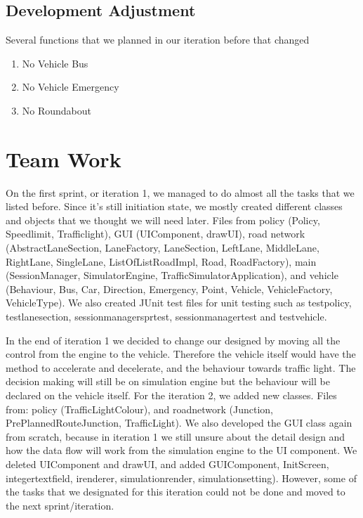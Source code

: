 \documentclass[11pt]{article}
\begin{document}
\subsection{Development Adjustment}
Several functions that we planned in our iteration before that changed
\begin{enumerate}[noitemsep]
	\item No Vehicle Bus 
	\item No Vehicle Emergency
	\item No Roundabout  
\end{enumerate}

\section{Team Work}
On the first sprint, or iteration 1, we managed to do almost all the tasks that we listed before. Since it's still initiation state, we mostly created different classes and objects that we thought we will need later. Files from policy (Policy, Speedlimit, Trafficlight), GUI (UIComponent, drawUI), road network (AbstractLaneSection, LaneFactory, LaneSection, LeftLane, MiddleLane, RightLane, SingleLane, ListOfListRoadImpl, Road, RoadFactory), main (SessionManager, SimulatorEngine, TrafficSimulatorApplication), and vehicle (Behaviour, Bus, Car, Direction, Emergency, Point, Vehicle, VehicleFactory, VehicleType). We also created JUnit test files for unit testing such as testpolicy, testlanesection, sessionmanagersprtest, sessionmanagertest and testvehicle. 

In the end of iteration 1 we decided to change our designed by moving all the control from the engine to the vehicle. Therefore the vehicle itself would have the method to accelerate and decelerate, and the behaviour towards traffic light. The decision making will still be on simulation engine but the behaviour will be declared on the vehicle itself. 
For the iteration 2, we added new classes. Files from: policy (TrafficLightColour), and roadnetwork (Junction, PrePlannedRouteJunction, TrafficLight). We also developed the GUI class again from scratch, because in iteration 1 we still unsure about the detail design and how the data flow will work from the simulation engine to the UI component. We deleted UIComponent and drawUI, and added GUIComponent, InitScreen, integertextfield, irenderer, simulationrender, simulationsetting). However, some of the tasks that we designated for this iteration could not be done and moved to the next sprint/iteration.  
\end{document}
